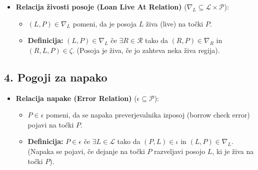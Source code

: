 \documentclass{article}
\begin{document}
\begin{itemize}
	\item \textbf{Relacija živosti posoje (Loan Live At Relation)} ($\nabla_{L} \subseteq \mathcal{L} \times \mathcal{P}$):
	      \begin{itemize}
		      \item $(L, P) \in \nabla_{L}$ pomeni, da je posoja $L$ živa (live) na točki $P$.
		      \item \textbf{Definicija:} $(L, P) \in \nabla_{L}$ če $\exists R \in \mathcal{R}$ tako da $(R, P) \in \nabla_{R}$ in $(R, L, P) \in \zeta$. (Posoja je živa, če jo zahteva neka živa regija).
	      \end{itemize}
\end{itemize}

\subsection*{4. Pogoji za napako}

\begin{itemize}
	\item \textbf{Relacija napake (Error Relation)} ($\epsilon \subseteq \mathcal{P}$):
	      \begin{itemize}
		      \item $P \in \epsilon$ pomeni, da se napaka preverjevalnika izposoj (borrow check error) pojavi na točki $P$.
		      \item \textbf{Definicija:} $P \in \epsilon$ če $\exists L \in \mathcal{L}$ tako da $(P, L) \in \iota$ in $(L, P) \in \nabla_{L}$. (Napaka se pojavi, če dejanje na točki $P$ razveljavi posojo $L$, ki je živa na točki $P$).
	      \end{itemize}
\end{itemize}
\end{document}
